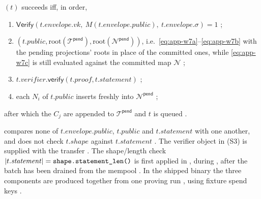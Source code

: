 \begin{definition}
\label{def:app-admit-seq}
$(t)$ succeeds iff, in order,
\begin{enumerate}
  \item[(S1)] $\mathsf{Verify}(t.\mathit{envelope}.vk,\ M(t.\mathit{envelope}.\mathit{public}),\ t.\mathit{envelope}.\sigma)=1$
        ;
  \item[(S2)] $(t.\mathit{public}, \mathrm{root}(\mathcal{T}^{\mathsf{pend}}), \mathrm{root}(\mathcal{N}^{\mathsf{pend}}))$,
        i.e.\ \eqref{eq:app-w7a}--\eqref{eq:app-w7b} with the pending
        projections' roots in place of the committed ones, while
        \eqref{eq:app-w7c} is still evaluated against the committed map
        $\mathcal{N}$ 
        ;
  \item[(S3)] $t.\mathit{verifier}.\mathsf{verify}(t.\mathit{proof}, t.\mathit{statement})$
        ;
  \item[(S4)] each $N_i$ of $t.\mathit{public}$ inserts freshly into
        $\mathcal{N}^{\mathsf{pend}}$ ;
\end{enumerate}
after which the $C_j$ are appended to $\mathcal{T}^{\mathsf{pend}}$ and $t$ is
queued .
\end{definition}

\begin{property}
\label{prop:app-seq-gaps}
 compares none of $t.\mathit{envelope}.\mathit{public}$,
$t.\mathit{public}$ and $t.\mathit{statement}$ with one another, and does not
check $t.\mathit{shape}$ against $t.\mathit{statement}$
. The verifier object in (S3) is
supplied with the transfer 
. The shape/length check
$|t.\mathit{statement}| = \texttt{shape.statement\_\allowbreak{}len()}$ is first applied in
 , during
, after the batch has been drained from the mempool
 . In the shipped
binary the three components are produced together from one proving run
, using fixture spend keys
 .
\end{property}

